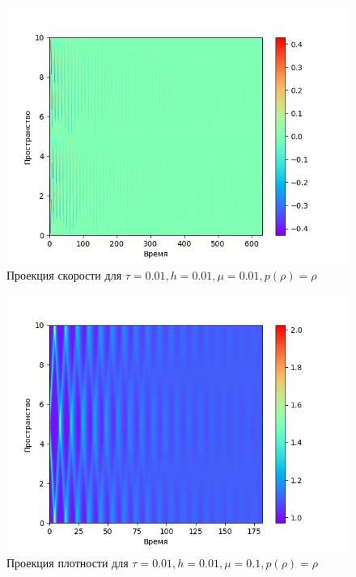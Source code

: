 \begin{center}
\begin{figure}[H]
    \centering
    \includegraphics[height=0.4\textheight]{pics/task2/u-2-2-21_1.png}
    \caption{Проекция скорости для $\tau = 0.01, h = 0.01, \mu = 0.01, p(\rho) = \rho$}
\end{figure}

\begin{figure}[H]
    \centering
    \includegraphics[height=0.4\textheight]{pics/task2/h-2-2-11_1.png}
    \caption{Проекция плотности для $\tau = 0.01, h = 0.01, \mu = 0.1, p(\rho) = \rho$}
\end{figure}


\end{center}
